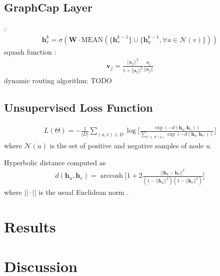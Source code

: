 \documentclass{IEEEtran}
\DeclareMathOperator{\arccosh}{arccosh}
{\tiny }
\begin{document}
	\subsection{GraphCap Layer}
	\cite{hamilton2017inductive}:
	\begin{align*}
	\textbf{h}^k_v = \sigma(\textbf{W}\cdot \mathrm{MEAN}(\{\textbf{h}^{k-1}_v\}\cup\{\textbf{h}^{k-1}_u, \forall u\in \mathcal{N}(v)\}))
	\end{align*}
	squash function \cite{sabour2017dynamic}:
	\begin{align*}
	\textbf{v}_j = \frac{||\textbf{s}_j||^2}{1 + ||\textbf{s}_j||^2}
	\frac{\textbf{s}_j}{||\textbf{s}_j||}
	\end{align*}
	dynamic routing algorithm: \cite{sabour2017dynamic}
	TODO
	\subsection{Unsupervised Loss Function}
	\begin{align*}
	L(\Theta) = -\frac{1}{|D|} \sum_{(u, v) \in D} \log \bigg[\frac{\exp(-d(\textbf{h}_u, \textbf{h}_v))}{\sum_{v' \in \mathcal{N}(u)} \exp(-d(\textbf{h}_u, \textbf{h}_{v'}))} \bigg]
	\end{align*}
	where $\mathcal{N}(u)$ is the set of positive and negative samples of node $u$. 
	
	Hyperbolic distance computed as 
	\begin{align*}
	d(\textbf{h}_u, \textbf{h}_v) = \arccosh \bigg[1 + 2\frac{||\textbf{h}_u -\textbf{h}_v||^2}{(1 - ||\textbf{h}_u||^2)(1-||\textbf{h}_v||^2)}\bigg]
	\end{align*}
	where $||\cdot||$ is the usual Euclidean norm \cite{nickel2017poincar}.
	
	\section{Results}
	
	\section{Discussion}
	
	
	
	
	
\end{document}
